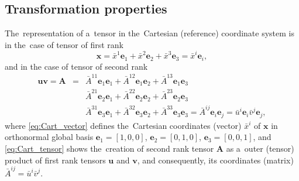 \documentclass[review]{elsarticle}
\newcommand{\vect}[1]{\boldsymbol{#1}}
\newcommand{\matr}[1]{\mathbf{#1}}
\begin{document}
\subsection{Transformation properties} 
The~representation of a~tensor in the~Cartesian (reference) coordinate
system is in the~case of tensor of first rank
\begin{equation}
  \vect{x} = \bar{x}^1 \vect{e}_1 + \bar{x}^2 \vect{e}_2 + 
  \bar{x}^3 \vect{e}_3 = \bar{x}^i \vect{e}_i ,
  \label{eq:Cart_vector}
\end{equation}
and in the case of tensor of second rank
\begin{eqnarray}
  \vect{u}\vect{v} = \matr{A} &=& 
  \bar{A}^{11} \vect{e}_1\vect{e}_1  + \bar{A}^{12} \vect{e}_1\vect{e}_2 
  + \bar{A}^{13} \vect{e}_1\vect{e}_3 \nonumber\\
  && \bar{A}^{21} \vect{e}_2\vect{e}_1  + \bar{A}^{22} \vect{e}_2\vect{e}_2 
  + \bar{A}^{23} \vect{e}_2\vect{e}_3\nonumber\\
  && \bar{A}^{31} \vect{e}_3\vect{e}_1  + \bar{A}^{32} \vect{e}_3\vect{e}_2 
  + \bar{A}^{33} \vect{e}_3\vect{e}_3 = \bar{A}^{ij}\vect{e}_i\vect{e}_j 
  = \bar{u}^i\vect{e}_i \bar{v}^j\vect{e}_j ,
  \label{eq:Cart_tensor}
\end{eqnarray}  
where \eqref{eq:Cart_vector} defines the~Cartesian coordinates (vector) 
$\bar{x}^i$ of $\vect{x}$  in orthonormal global basis 
$\vect{e}_1 = [1, 0, 0]$, $\vect{e}_2 = [0, 1, 0]$,
$\vect{e}_3 = [0, 0, 1]$, and \eqref{eq:Cart_tensor} shows the~creation of
second rank tensor $\matr{A}$ as a~outer (tensor) product of first rank tensors
$\vect{u}$ and $\vect{v}$, 
and consequently, its coordinates (matrix) $\bar{A}^{ij} = \bar{u}^i \bar{v}^j$.
\end{document}
